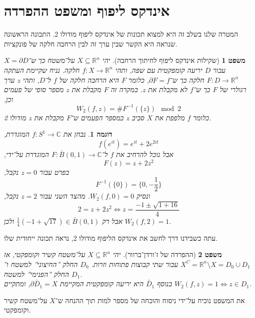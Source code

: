 \documentclass[aspectratio=169,notheorems,mathserif]{beamer}
\newcommand{\CC}[0]{\mathbb{C}}
\newcommand{\RR}[0]{\mathbb{R}}
\theoremstyle{c_plain}
\newtheorem{theorem}{משפט}[section]
\theoremstyle{c_definition}
\newtheorem{example}{דוגמה}[section]
\theoremstyle{c_remark}
\begin{document}
\section{אינדקס ליפוף ומשפט ההפרדה}
\begin{frame}
	המטרה שלנו בשלב זה היא למצוא תכונות של אינדקס ליפוף מודולו 2.
	התכונה הראשונה שנראה היא הקשר שבין ערך זה לבין הרחבה חלקה של פונקציות.
	\begin{theorem}[שקילות אינדקס ליפוף לחיתוך הרחבה]
		יהי $X \subseteq \RR^n$ על־משטח כך ש־$X = \partial D$ עבור $D$ יריעה קומפקטית עם שפה, ותהי $f : X \to \RR^n$ חלקה.
		נניח שקיימת העתקה $F : D \to \RR^n$ חלקה כך ש־$\partial F = f$, כלומר $F$ היא הרחבה חלקה של $f$ ל־$D$, ותהי $z$ ערך רגולרי של $F$ כך ש־$f$ לא מקבלת את $z$.
		במקרה זה $F$ מקבלת את $z$ מספר סופי של פעמים וכן,
		\[
			W_2(f, z)
			= \# F^{-1}(\{ z \}) \mod 2
		\]
		כלומר $f$ מלפפת את $X$ סביב $z$ כמספר הפעמים ש־$F$ מקבלת את $z$ מודולו 2.
	\end{theorem}
\end{frame}
\begin{frame}
	\begin{example}
		נבחן את $f : S^1 \to \CC$ המוגדרת,
		\[
			f(e^{i t}) = e^{i t} + 2 e^{2i t}
		\]
		אבל נוכל להרחיב את $f$ ל־$F : \bar{B}(0, 1) \to \CC$ המוגדרת על־ידי,
		\[
			F(z) = z + 2 z^2
		\]
		בפרט עבור $z = 0$ נקבל,
		\[
			F^{-1}(\{ 0 \})
			= \{ 0, -\frac{1}{2} \}
		\]
		ונסיק $W_2(f, 0) = 0$.
		מהצד השני עבור $z = 2$ נקבל,
		\[
			2 = z + 2 z^2
			\iff z = \frac{-1 \pm \sqrt{1 + 16}}{4}
		\]
		אבל רק $\frac{1}{4}(-1 + \sqrt{17}) \in \bar{B}(0, 1)$ ולכן $W_2(f, 2) = 1$.
	\end{example}
\end{frame}
\begin{frame}
	עתה כשבידנו דרך לחשב את אינדקס הליפוף מודולו 2, נראה תכונה ייחודית שלו.
	\begin{theorem}[ההפרדה של ז'ורדן־ברוור]
		יהי $X \subseteq \RR^n$ על־משטח קשיר וקומפקטי,
		אז $X^C = \RR^n \setminus X = D_0 \cup D_1$ עבור שתי קבוצות פתוחות וזרות.
		$D_0$ החלק ''החיצוני'' למשטח ו־$D_1$ החלק ''הפנימי'' למשטח. \\
		בנוסף $\bar{D}_1$ היא יריעה קומפקטית המקיימת $\partial \bar{D}_1 = X$, ומתקיים $W_2(f, z) = 1 \iff z \in D_1$.
	\end{theorem}
	את המשפט נוכיח על־ידי ניסוח והוכחה של מספר למות תוך ההנחה ש־$X$ על־משטח קשיר וקומפקטי.
\end{frame}
\end{document}
